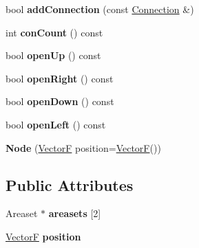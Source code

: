 \begin{DoxyCompactItemize}
\item 
\hypertarget{classNode_a1adae23476112f3cfa2a29e0c43759d3}{bool {\bfseries add\+Connection} (const \hyperlink{structConnection}{Connection} \&)}\label{classNode_a1adae23476112f3cfa2a29e0c43759d3}

\item 
\hypertarget{classNode_adb1a2bb6cbbb29ebecfe7a2ec59955c7}{int {\bfseries con\+Count} () const }\label{classNode_adb1a2bb6cbbb29ebecfe7a2ec59955c7}

\item 
\hypertarget{classNode_aa8e730f4312f3e07855fcad130efd9d9}{bool {\bfseries open\+Up} () const }\label{classNode_aa8e730f4312f3e07855fcad130efd9d9}

\item 
\hypertarget{classNode_a29cd0712d13c59420d4c66269a64c5f1}{bool {\bfseries open\+Right} () const }\label{classNode_a29cd0712d13c59420d4c66269a64c5f1}

\item 
\hypertarget{classNode_a39a07081bb9473f5b7e6f95519e3a6b2}{bool {\bfseries open\+Down} () const }\label{classNode_a39a07081bb9473f5b7e6f95519e3a6b2}

\item 
\hypertarget{classNode_a76dc3334942fd5dd30c650018b4e7d4e}{bool {\bfseries open\+Left} () const }\label{classNode_a76dc3334942fd5dd30c650018b4e7d4e}

\item 
\hypertarget{classNode_a89989d52fa93844ca1be5f0c4f96ae8f}{{\bfseries Node} (\hyperlink{structVectorF}{Vector\+F} position=\hyperlink{structVectorF}{Vector\+F}())}\label{classNode_a89989d52fa93844ca1be5f0c4f96ae8f}

\end{DoxyCompactItemize}
\subsection*{Public Attributes}
\begin{DoxyCompactItemize}
\item 
\hypertarget{classNode_a7771548b1788566ae2af70da09edd3e0}{Areaset $\ast$ {\bfseries areasets} \mbox{[}2\mbox{]}}\label{classNode_a7771548b1788566ae2af70da09edd3e0}

\item 
\hypertarget{classNode_a47b5558f6416791a4789051c64411c3e}{\hyperlink{structVectorF}{Vector\+F} {\bfseries position}}\label{classNode_a47b5558f6416791a4789051c64411c3e}

\end{DoxyCompactItemize}
